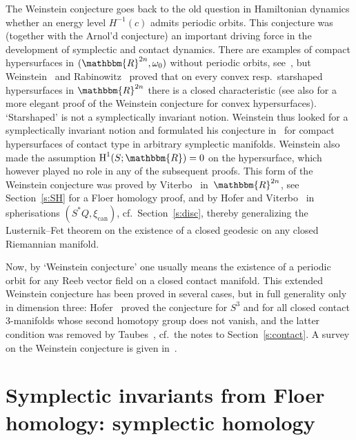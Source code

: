 \documentclass[12pt,twoside]{amsart}
\theoremstyle{plain}
\numberwithin{figure}{section}
\numberwithin{equation}{section}
\def\can{\operatorname{can}}
\def\H{\operatorname{H}}
\def\go{\omega}
\def\RR{\mathbbm{R}}
\begin{document}
The Weinstein conjecture goes back to the old question in Hamiltonian dynamics 
whether an energy level $H^{-1}(c)$ admits periodic orbits. 
%
This conjecture was (together with the Arnol'd conjecture) an important driving force 
in the development of symplectic and contact dynamics.
%
%
There are examples of compact hypersurfaces in $(\RR^{2n},\omega_0)$ without periodic orbits, 
see~\cite{Gi97, He99}, but
Weinstein~\cite{Wei78} and Rabinowitz~\cite{Rab78} proved that on every  
convex resp.\ starshaped hypersurfaces in $\RR^{2n}$ there is a closed characteristic 
(see also \cite{cla81} for a more elegant proof of the Weinstein conjecture for convex hypersurfaces).
`Starshaped' is not a symplectically invariant notion. 
Weinstein thus looked for a symplectically invariant notion and formulated his conjecture 
in~\cite{Wei79} for compact hypersurfaces of contact type in arbitrary symplectic manifolds.
Weinstein also made the assumption $\H^1(S;\RR)=0$ on the hypersurface, 
which however played no role in any of the subsequent proofs.
This form of the Weinstein conjecture was proved by Viterbo~\cite{Vi87} in~$\RR^{2n}$, 
see Section~\ref{s:SH} for a Floer homology proof,
and by Hofer and Viterbo~\cite{HoVi89} in spherisations $(S^*Q, \xi_{\can})$,
cf.\ Section~\ref{s:disc},
thereby generalizing the Lusternik--Fet theorem on the existence of a closed geodesic on any closed Riemannian manifold.  

Now, by `Weinstein conjecture' one usually means the existence of a periodic orbit for any Reeb vector field on a closed contact manifold.
This extended Weinstein conjecture has been proved in several cases, 
but in full generality only in dimension three:
Hofer~\cite{Ho93} proved the conjecture for $S^3$ and for all closed contact 3-manifolds whose second homotopy group does not vanish, and the latter condition was removed by Taubes~\cite{Ta07},
cf.\ the notes to Section~\ref{s:contact}.
%
A survey on the Weinstein conjecture is given in~\cite{Gi05}.


\section{Symplectic invariants from Floer homology: symplectic homology}
\label{s:symphom}
\end{document}
